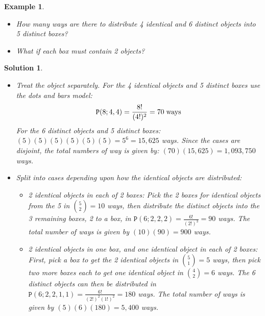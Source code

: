 \documentclass[12pt, letterpaper, onecolumn, conference, final]{IEEEtran}
\theoremstyle{definition}
\theoremstyle{plain}
\newtheorem{example}{Example}[section]
\newtheorem{solution}{Solution}[section]
\begin{document}
\begin{example}
\hfill
\begin{itemize}

\item[(a)]
How many ways are there to distribute 4 identical and 6 distinct objects into 5 distinct boxes?

\vspace{.2cm}
\item[(b)]
What if each box must contain 2 objects?

\end{itemize}
\end{example}
\begin{solution}
\hfill
\begin{itemize}

\item[(a)]
Treat the object separately. For the 4 identical objects and 5 distinct boxes use the dots and bars model:
\begin{equation*}
\mathtt{P}(8;4,4) = \frac{8!}{(4!)^2} = 70 \hspace{.1cm} \text{ways}
\end{equation*}
For the 6 distinct objects and 5 distinct boxes: $(5)(5)(5)(5)(5)(5) = 5^6 = 15,625$ ways. Since the cases are disjoint, the total numbers of way is given by: $(70)(15,625) = 1,093,750$ ways.

\vspace{.2cm}
\item[(b)]
Split into cases depending upon how the identical objects are distributed:
\begin{itemize}

\vspace{.2cm}
\item[(i)]
2 identical objects in each of 2 boxes: Pick the 2 boxes for identical objects from the 5 in ${5 \choose 2} = 10$ ways, then distribute the distinct objects into the 3 remaining boxes, 2 to a box, in $\mathtt{P}(6;2,2,2) = \frac{6!}{(2!)^3} = 90$ ways. The total number of ways is given by $(10)(90) = 900$ ways.

\vspace{.2cm}
\item[(ii)]
2 identical objects in one box, and one identical object in each of 2 boxes: First, pick a box to get the 2 identical objects in ${5 \choose 1} = 5$ ways, then pick two more boxes each to get one identical object in ${4 \choose 2} = 6$ ways. The 6 distinct objects can then be distributed in $\mathtt{P}(6;2,2,1,1) = \frac{6!}{(2!)^2(1!)^2} = 180$ ways. The total number of ways is given by $(5)(6)(180) = 5,400$ ways.


\end{itemize}
\end{itemize}
\end{solution}
\end{document}
